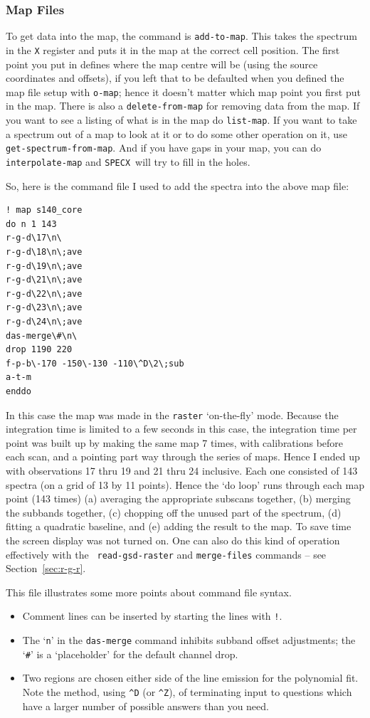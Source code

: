\documentclass[11pt,twoside]{article}
\newcommand{\SPECX}{{\tt SPECX}}
\begin{document}
\subsubsection{Map Files}
\label{sec:specx_13.2}
To get data into the map, the command is {\tt add-to-map}.  This takes
the spectrum in the {\tt X} register and puts it in the map at the
correct cell position.  The first point you put in defines where the
map centre will be (using the source coordinates and offsets), if you
left that to be defaulted when you defined the map file setup with
{\tt o-map}; hence it doesn't matter which map point you first put in
the map. There is also a {\tt delete-from-map}
for removing data from the map.  If you want to see a listing of what is
in the map do {\tt list-map}. If you want to take a spectrum out of a
map to look at it or to do some other operation on it, use {\tt
get-spectrum-from-map}.  And if you have gaps in your map, you can do
{\tt interpolate-map} and \SPECX\ will try to fill in the holes.

So, here is the command file I used to add the spectra into the above
map file:

\begin{verbatim}
! map s140_core
do n 1 143
r-g-d\17\n\
r-g-d\18\n\;ave
r-g-d\19\n\;ave
r-g-d\21\n\;ave
r-g-d\22\n\;ave
r-g-d\23\n\;ave
r-g-d\24\n\;ave
das-merge\#\n\
drop 1190 220
f-p-b\-170 -150\-130 -110\^D\2\;sub
a-t-m
enddo
\end{verbatim}

In this case the map was made in the {\tt raster} `on-the-fly'
mode. Because the integration time is limited to a few seconds in this
case, the integration time per point was built up by making the same
map 7 times, with calibrations before each scan, and a pointing part
way through the series of maps. Hence I ended up with observations 17
thru 19 and 21 thru 24 inclusive. Each one consisted of 143 spectra
(on a grid of 13 by 11 points). Hence the `do loop' runs through each
map point (143 times) (a) averaging the appropriate subscans together,
(b) merging the subbands together, (c) chopping off the unused part of
the spectrum, (d) fitting a quadratic baseline, and (e) adding the
result to the map. To save time the screen display was not turned
on. One can also do this kind of operation effectively with the {\tt
read-gsd-raster} and {\tt merge-files} commands -- see
Section~\ref{sec:r-g-r}.

This file illustrates some more points about command file syntax.
\begin{itemize}
\item
Comment lines can be inserted by starting the lines with {\tt !}.
\item
The `{\tt{n}}' in the {\tt das-merge} command inhibits subband offset
adjustments; the `\verb|#|' is a `placeholder' for the default channel
drop.
\item
Two regions are chosen either side of the line emission for the
polynomial fit.  Note the method, using \verb|^D| (or \verb|^Z|), of
terminating
input to questions which have a larger number of possible answers
than you need.
\end{itemize}
\end{document}
